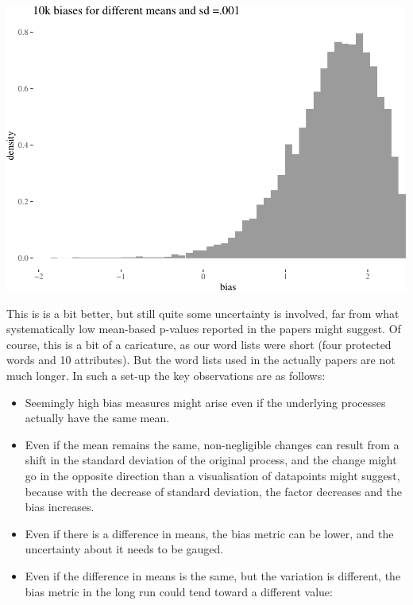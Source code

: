 \documentclass[10pt,dvipsnames,enabledeprecatedfontcommands]{scrartcl}
\begin{document}
\begin{center}\includegraphics[width=1\linewidth]{paperDraft_files/figure-latex/unnamed-chunk-16-1} \end{center}

\normalsize

This is is a bit better, but still quite some uncertainty is involved,
far from what systematically low mean-based p-values reported in the
papers might suggest. Of course, this is a bit of a caricature, as our
word lists were short (four protected words and 10 attributes). But the
word lists used in the actually papers are not much longer. In such a
set-up the key observations are as follows:

\begin{itemize}
\item
  Seemingly high bias measures might arise even if the underlying
  processes actually have the same mean.
\item
  Even if the mean remains the same, non-negligible changes can result
  from a shift in the standard deviation of the original process, and
  the change might go in the opposite direction than a visualisation of
  datapoints might suggest, because with the decrease of standard
  deviation, the factor decreases and the bias increases.
\item
  Even if there is a difference in means, the bias metric can be lower,
  and the uncertainty about it needs to be gauged.
\item
  Even if the difference in means is the same, but the variation is
  different, the bias metric in the long run could tend toward a
  different value:
\end{itemize}
\end{document}
